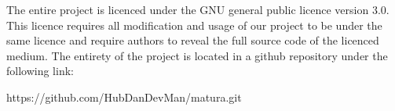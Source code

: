 The entire project is licenced under the GNU general public licence version 3.0. This licence requires all
modification and usage of our project to be under the same licence and require authors to reveal
the full source code of the licenced medium. The entirety of the project is located in a github
repository under the following link:

https://github.com/HubDanDevMan/matura.git
